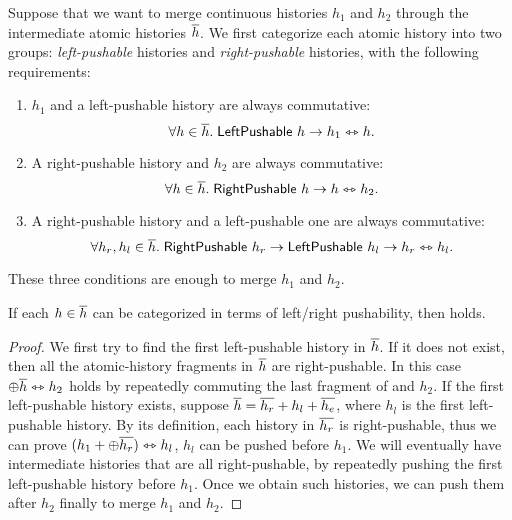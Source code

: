 Suppose that we want to merge continuous histories $h_1$ and $h_2$ through the intermediate atomic histories $\overline{h}$.
We first categorize each atomic history into two groups: \emph{left-pushable} histories and \emph{right-pushable} histories, with the following requirements:
\begin{enumerate}
\item $h_1$ and a left-pushable history are always commutative:
  \begin{displaymath}
    \forall h \in \overline{h}.\; \mathsf{LeftPushable}\ h \to h_1 \leftrightarrowtriangle h.
  \end{displaymath}
\item A right-pushable history and $h_2$ are always commutative:
  \begin{displaymath}
    \forall h \in \overline{h}.\; \mathsf{RightPushable}\ h \to h \leftrightarrowtriangle h_2.
  \end{displaymath}
\item A right-pushable history and a left-pushable one are always commutative:
  \begin{displaymath}
    \forall h_r, h_l \in \overline{h}.\; \mathsf{RightPushable}\ h_r \to \mathsf{LeftPushable}\ h_l \to h_r \leftrightarrowtriangle h_l.
  \end{displaymath}
\end{enumerate}

These three conditions are enough to merge $h_1$ and $h_2$.
\begin{theorem}\label{thm-push-imp-mgb}
  If each $h \in \overline{h}$ can be categorized in terms of left/right pushability, then  holds.
\end{theorem}
\begin{proof}
  We first try to find the first left-pushable history in $\overline{h}$.
  If it does not exist, then all the atomic-history fragments in $\overline{h}$ are right-pushable.
  In this case $\oplus \overline{h} \leftrightarrowtriangle h_2$ holds by repeatedly commuting the last fragment of  and $h_2$.
  If the first left-pushable history exists, suppose $\overline{h} = \overline{h_r} + h_l + \overline{h_e}$, where $h_l$ is the first left-pushable history.
  By its definition, each history in $\overline{h_r}$ is right-pushable, thus we can prove $(h_1 + \oplus \overline{h_r}) \leftrightarrowtriangle h_l$, \ie{} $h_l$ can be pushed before $h_1$.
  We will eventually have intermediate histories that are all right-pushable, by repeatedly pushing the first left-pushable history before $h_1$.
  Once we obtain such histories, we can push them after $h_2$ finally to merge $h_1$ and $h_2$.
\end{proof}

